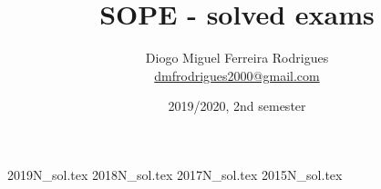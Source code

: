 \documentclass[a4paper]{book}
\title{SOPE - solved exams}
\author{Diogo Miguel Ferreira Rodrigues \\ \href{mailto:dmfrodrigues2000@gmail.com}{dmfrodrigues2000@gmail.com}}
\date{2019/2020, 2nd semester}
\begin{document}
\begingroup
	\maketitle
	\let\clearpage\relax
	\setcounter{tocdepth}{1}
	\tableofcontents
\endgroup
{2019N_sol.tex}
{2018N_sol.tex}
{2017N_sol.tex}
{2015N_sol.tex}
\end{document}
